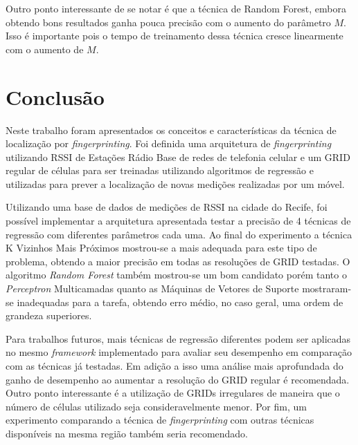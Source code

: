 \documentclass[12pt]{article}
\begin{document}
        Outro ponto interessante de se notar é que a técnica de Random Forest, embora obtendo bons resultados ganha pouca precisão com o aumento do parâmetro $M$. Isso é importante pois o tempo de treinamento dessa técnica cresce linearmente com o aumento de $M$.

    \newpage
    \section{Conclusão}
    \label{seq:conclusao}
    
    Neste trabalho foram apresentados os conceitos e características da técnica de localização por \textit{fingerprinting}. Foi definida uma arquitetura de \textit{fingerprinting} utilizando RSSI de Estações Rádio Base de redes de telefonia celular e um GRID regular de células para ser treinadas utilizando algoritmos de regressão e utilizadas para prever a localização de novas medições realizadas por um móvel.
    
    Utilizando uma base de dados de medições de RSSI na cidade do Recife, foi possível implementar a arquitetura apresentada testar a precisão de 4 técnicas de regressão com diferentes parâmetros cada uma. Ao final do experimento a técnica K Vizinhos Mais Próximos mostrou-se a mais adequada para este tipo de problema, obtendo a maior precisão em todas as resoluções de GRID testadas. O algoritmo \textit{Random Forest} também mostrou-se um bom candidato porém tanto o \textit{Perceptron} Multicamadas quanto as Máquinas de Vetores de Suporte mostraram-se inadequadas para a tarefa, obtendo erro médio, no caso geral, uma ordem de grandeza superiores.
    
    Para trabalhos futuros, mais técnicas de regressão diferentes podem ser aplicadas no mesmo \textit{framework} implementado para avaliar seu desempenho em comparação com as técnicas já testadas. Em adição a isso uma análise mais aprofundada do ganho de desempenho ao aumentar a resolução do GRID regular é recomendada. Outro ponto interessante é a utilização de GRIDs irregulares de maneira que o número de células utilizado seja consideravelmente menor. Por fim, um experimento comparando a técnica de \textit{fingerprinting} com outras técnicas disponíveis na mesma região também seria recomendado.

    \newpage
    
    {\small }
    
    \newpage
    \appendix
    
\end{document}
